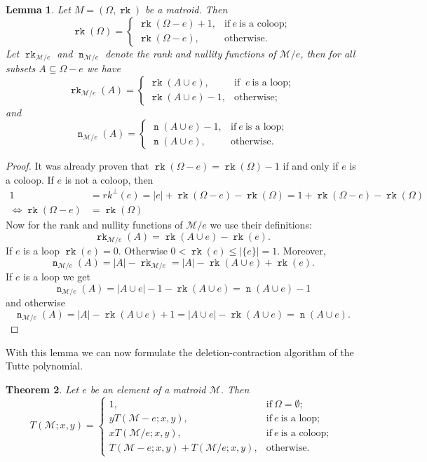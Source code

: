 \documentclass[12pt,a4paper, twoside, autooneside=false]{scrartcl}
\newtheorem{theorem}{Theorem}[section]
\newtheorem{lemma}[theorem]{Lemma}
\theoremstyle{definition}
\theoremstyle{remark}
\numberwithin{equation}{section}
\DeclareMathOperator{\rk}{\mathtt{rk}}
\DeclareMathOperator{\n}{\mathtt{n}}
\newcommand{\M}{\mathcal{M}} %
\begin{document}
\begin{lemma}
Let $M = (\Omega, \rk)$ be a matroid. Then 
\begin{equation} \label{(2)}
\rk(\Omega) = 
\begin{cases}
\rk(\Omega - e) + 1, & \text{if} \ e \ \text{is a coloop}; \\
\rk(\Omega - e), & \text{otherwise}.
\end{cases}
\end{equation}
Let $\rk_{\M / e}$ and $\n_{\M / e}$ denote the rank and nullity functions of $\M / e$, then for all subsets $A \subseteq \Omega - e$ we have
\begin{equation}\label{(3)}
\rk_{\M / e }(A) = \begin{cases}
\rk(A \cup e), & \text{if } \ e \ \text{is a loop}; \\ 
\rk(A \cup e) - 1, & \text{otherwise}; 
\end{cases}
\end{equation}
and 
\begin{equation} \label{(4)}
\n_{\M / e}(A) = \begin{cases}
\n(A \cup e) - 1, & \text{if} \ e \ \text{is a loop}; \\
\n(A \cup e), & \text{otherwise}.
\end{cases}
\end{equation}
\end{lemma}
\begin{proof}
It was already proven that $\rk(\Omega - e) = \rk(\Omega) - 1$ if and only if $e$ is a coloop. If $e$ is not a coloop, then 
\begin{align*}
1 &= rk^\perp(e) = |e| + \rk(\Omega - e) - \rk(\Omega) = 1 + \rk (\Omega - e) - \rk(\Omega) \\ 
\Longleftrightarrow \rk(\Omega - e) &= \rk(\Omega)
\end{align*}
Now for the rank and nullity functions of $\M /e $ we use their definitions: 
\[
\rk_{\M / e}(A) = \rk(A \cup e) - \rk(e). 
\]
 If $e$ is a loop $\rk(e) = 0$. Otherwise $0 < \rk(e) \leq |\{e\}| = 1$. Moreover,
\[
\n_{\M / e}(A) = |A| - \rk_{\M / e} = |A| - \rk(A \cup e) + \rk(e).
\] If $e$ is a loop we get \[
\n_{\M / e}(A) = |A \cup e| - 1 - \rk(A \cup e) = \n(A \cup e) - 1
\]
and otherwise 
\[
\n_{\M / e}(A) = |A| - \rk(A \cup e) + 1 = |A \cup e| - \rk(A \cup e) = \n(A \cup e).
\]
\end{proof}
With this lemma we can now formulate the deletion-contraction algorithm of the Tutte polynomial. 
\begin{theorem}
Let $e$ be an element of a matroid $\M$. Then 
\[
T(\M; x,y) = \begin{cases}
 1, & \text{if} \ \Omega = \emptyset; \\
 yT(\M - e; x,y), & \text{if} \ e \ \text{is a loop}; \\  xT(\M / e; x,y), & \text{if} \ e \ \text{is a coloop}; \\ 
 T(\M - e; x,y) + T(\M / e; x,y), & \text{otherwise}.
\end{cases}
\]
\end{theorem}
\end{document}
